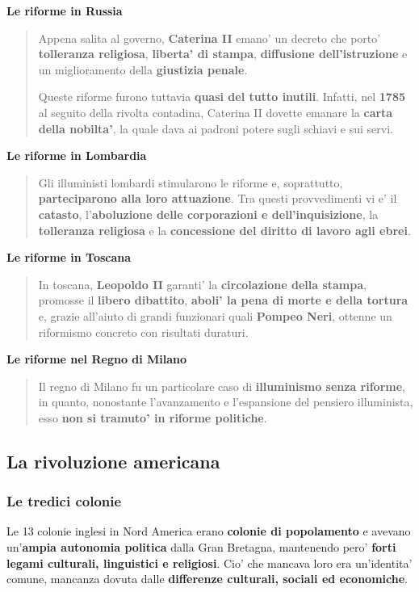 \documentclass{article}
\begin{document}
{{    \textbf{Le riforme in Russia}
    \begin{quote}
      Appena salita al governo, \textbf{Caterina II} emano' un decreto che porto' \textbf{tolleranza religiosa}, \textbf{liberta' di stampa}, \textbf{diffusione dell'istruzione} e un miglioramento della \textbf{giustizia penale}.

      Queste riforme furono tuttavia \textbf{quasi del tutto inutili}. Infatti, nel \textbf{1785} al seguito della rivolta contadina, Caterina II dovette emanare la \textbf{carta della nobilta'}, la quale dava ai padroni potere sugli schiavi e sui servi.
    \end{quote}

    \textbf{Le riforme in Lombardia}
    \begin{quote}
      Gli illuministi lombardi stimularono le riforme e, soprattutto, \textbf{parteciparono alla loro attuazione}. Tra questi provvedimenti vi e' il \textbf{catasto}, l'\textbf{aboluzione delle corporazioni e dell'inquisizione}, la \textbf{tolleranza religiosa} e la \textbf{concessione del diritto di lavoro agli ebrei}.
    \end{quote}

    \textbf{Le riforme in Toscana}
    \begin{quote}
      In toscana, \textbf{Leopoldo II} garanti' la \textbf{circolazione della stampa}, promosse il \textbf{libero dibattito}, \textbf{aboli' la pena di morte e della tortura} e, grazie all'aiuto di grandi funzionari quali \textbf{Pompeo Neri}, ottenne un riformismo concreto con risultati duraturi.
    \end{quote}

    \textbf{Le riforme nel Regno di Milano}
    \begin{quote}
      Il regno di Milano fu un particolare caso di \textbf{illuminismo senza riforme}, in quanto, nonostante l'avanzamento e l'espansione del pensiero illuminista, esso \textbf{non si tramuto' in riforme politiche}.
    \end{quote}

    \subsection{La rivoluzione americana}
    \subsubsection{Le tredici colonie} %
    Le 13 colonie inglesi in Nord America erano \textbf{colonie di popolamento} e avevano un'\textbf{ampia autonomia politica} dalla Gran Bretagna, mantenendo pero' \textbf{forti legami culturali, linguistici e religiosi}. Cio' che mancava loro era un'identita' comune, mancanza dovuta dalle \textbf{differenze culturali, sociali ed economiche}.

}}
\end{document}
